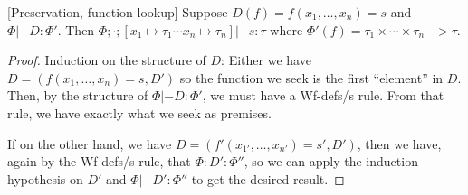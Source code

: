 \documentclass[a4paper, oneside, 10pt, final]{memoir}
\begin{document}
\begin{lem}{[Preservation, function lookup]}
  \label{lem:preservation-lookup}
  Suppose $D(f) = f(x_1, \dotsc, x_n) = s$ and $\Phi |- D :
  \Phi'$. Then $\Phi;\cdot;[x_1 \mapsto \tau_1 \dotsb x_n \mapsto
  \tau_n] |- s : \tau$ where $\Phi'(f) = \tau_1 \times \dotsb \times
  \tau_n -> \tau$.
\end{lem}
\begin{proof}
  Induction on the structure of $D$: Either we have $D = (f(x_1,
  \dotsc, x_n) = s, D')$ so the function we seek is the first
  ``element'' in $D$. Then, by the structure of $\Phi |- D : \Phi'$,
  we must have a Wf-defs/s rule. From that rule, we have exactly what
  we seek as premises.

  If on the other hand, we have $D = (f'(x_{1'}, \dotsc, x_{n'}) = s',
  D')$, then we have, again by the Wf-defs/s rule, that $\Phi : D' :
  \Phi''$, so we can apply the induction hypothesis on $D'$ and $\Phi
  |- D' : \Phi''$ to get the desired result.
\end{proof}
\end{document}
